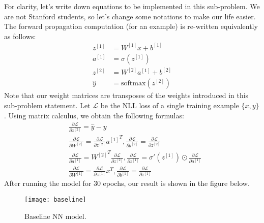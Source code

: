 \begin{answer}
For clarity, let's write down equations to be implemented in this sub-problem. We are not Stanford students, so let's change some notations to make our life easier. The forward propagation computation (for an example) is re-written equivalently as follows:
\begin{align}
	z^{[1]} &= W^{[1]}x + b^{[1]} \\
	a^{[1]} &= \sigma(z^{[1]}) \\
	z^{[2]}  &= W^{[2]} a^{[1]} + b^{[2]} \\
	\hat{y} &= \text{softmax}(z^{[2]})
\end{align}
Note that our weight matrices are transposes of the weights introduced in this sub-problem statement. Let $\mathcal{L}$ be the NLL loss of a single training example $\{x,y\}$. Using matrix calculus, we obtain the following formulas:
\begin{align}
	& \frac{\partial\mathcal{L}}{\partial z^{[2]}} = \hat{y} - y \\
	& \frac{\partial\mathcal{L}}{\partial W^{[2]}} = \frac{\partial\mathcal{L}}{\partial z^{[2]}} {a^{[1]}}^T, \frac{\partial\mathcal{L}}{\partial b^{[2]}} = \frac{\partial\mathcal{L}}{\partial z^{[2]}} \\
	& \frac{\partial\mathcal{L}}{\partial a^{[1]}} = {W^{[2]}}^T \frac{\partial\mathcal{L}}{\partial z^{[2]}}, \frac{\partial\mathcal{L}}{\partial z^{[1]}} = \sigma'(z^{[1]}) \odot \frac{\partial\mathcal{L}}{\partial a^{[1]}} \\
	&\frac{\partial\mathcal{L}}{\partial W^{[1]}} = \frac{\partial\mathcal{L}}{\partial z^{[1]}} x^T, \frac{\partial\mathcal{L}}{\partial b^{[1]}} = \frac{\partial\mathcal{L}}{\partial z^{[1]}}
\end{align}
After running the model for 30 epochs, our result is shown in the figure below.
\begin{figure}[H]
	\centering
	\texttt{[image: baseline]}
	\caption{Baseline NN model.}
\end{figure}
\end{answer}
   
 
 
 
 
 
 
 
 
 
 
 
 
 
 
 
 
 
 
 
 
 
 
 
 
 
